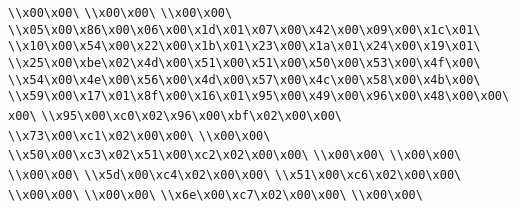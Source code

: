 \verb|\\x00\x00\|\newline
\verb|\\x00\x00\|\newline
\verb|\\x00\x00\|\newline
\verb|\\x05\x00\x86\x00\x06\x00\x1d\x01\x07\x00\x42\x00\x09\x00\x1c\x01\|\newline
\verb|\\x10\x00\x54\x00\x22\x00\x1b\x01\x23\x00\x1a\x01\x24\x00\x19\x01\|\newline
\verb|\\x25\x00\xbe\x02\x4d\x00\x51\x00\x51\x00\x50\x00\x53\x00\x4f\x00\|\newline
\verb|\\x54\x00\x4e\x00\x56\x00\x4d\x00\x57\x00\x4c\x00\x58\x00\x4b\x00\|\newline
\verb|\\x59\x00\x17\x01\x8f\x00\x16\x01\x95\x00\x49\x00\x96\x00\x48\x00\x00\x00\|\newline
\verb|\\x95\x00\xc0\x02\x96\x00\xbf\x02\x00\x00\|\newline
\verb|\\x73\x00\xc1\x02\x00\x00\|\newline
\verb|\\x00\x00\|\newline
\verb|\\x50\x00\xc3\x02\x51\x00\xc2\x02\x00\x00\|\newline
\verb|\\x00\x00\|\newline
\verb|\\x00\x00\|\newline
\verb|\\x00\x00\|\newline
\verb|\\x5d\x00\xc4\x02\x00\x00\|\newline
\verb|\\x51\x00\xc6\x02\x00\x00\|\newline
\verb|\\x00\x00\|\newline
\verb|\\x00\x00\|\newline
\verb|\\x6e\x00\xc7\x02\x00\x00\|\newline
\verb|\\x00\x00\|\newline
